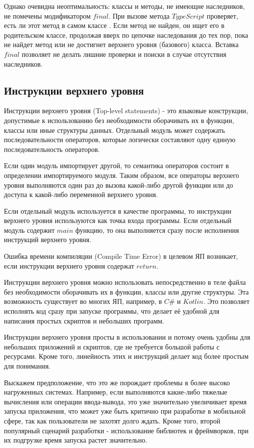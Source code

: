 \documentclass{mipt-thesis-bs}
\begin{document}
Однако очевидна неоптимальность: классы  и методы, не имеющие наследников,
не помечены модификатором $final$. При вызове метода $TypeScript$ проверяет,
есть ли этот метод
в самом классе \cite{tsspec}. Если метод не найден, он ищет его в родительском классе,
продолжая вверх по цепочке наследования до тех пор, пока не найдет метод
или не достигнет верхнего уровня (базового) класса. Вставка $final$ позволяет
не делать лишние проверки и поиски в случае отсутствия наследников.


\subsection{Инструкции верхнего уровня}

Инструкции верхнего уровня (Top-level statements) - это языковые конструкции, допустимые
к использованию без необходимости оборачивать их в функции, классы или иные структуры
данных. Отдельный модуль может содержать последовательности операторов,
которые логически составляют одну единую последовательность операторов.

Если один модуль импортирует другой, то семантика операторов
состоит в определении импортируемого модуля.
Таким образом, все операторы верхнего уровня выполняются один раз до
вызова какой-либо другой функции или до доступа к какой-либо
переменной верхнего уровня.

Если отдельный модуль используется в качестве программы, то инструкции
верхнего уровня используются как точка входа программы. Если отдельный
модуль содержит $main$ функцию, то она выполняется сразу после
исполнения инструкций верхнего уровня.

Ошибка времени компиляции (Compile Time Error) в целевом ЯП возникает, если
инструкции верхнего уровня содержат $return$.

Инструкции верхнего уровня можно использовать
непосредственно в теле файла без необходимости оборачивать их в функции,
классы или другие структуры. Эта возможность существует во многих ЯП, например,
в $C\#$ и $Kotlin$. Это позволяет исполнять код сразу при запуске программы, что делает её
удобной для написания простых скриптов и небольших программ.

Инструкции верхнего уровня просты в использовании и потому очень удобны
для небольших приложений и скриптов, где не требуется большой работы
с ресурсами. Кроме того, линейность этих и инструкций делает код
более простым для понимания.

Выскажем предположение, что это же порождает проблемы в более
высоко нагруженных системах. Например, если выполняются какие-либо
тяжелые вычисления или операции ввода-вывода, это уже значительно
увеличивает время запуска приложения, что может уже быть критично
при разработке в мобильной сфере, так как пользователи не захотят
долго ждать. Кроме того, второй популярный сценарий разработки -
использование библиотек и фреймворков, при их подгрузке время
запуска растет значительно.
\end{document}
